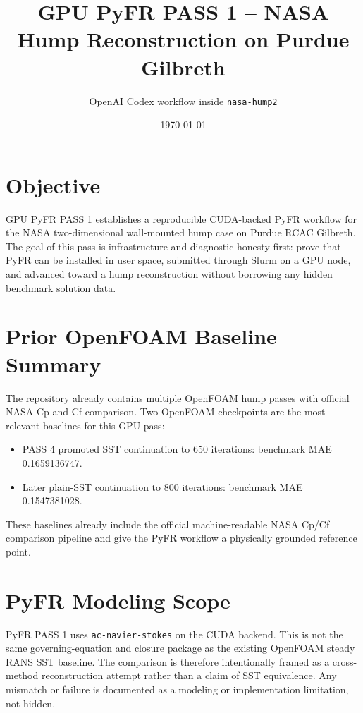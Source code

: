 \documentclass[11pt]{article}
\title{GPU PyFR PASS 1 -- NASA Hump Reconstruction on Purdue Gilbreth}
\author{OpenAI Codex workflow inside \texttt{nasa-hump2}}
\date{\today}
\begin{document}
\maketitle

\section{Objective}
GPU PyFR PASS 1 establishes a reproducible CUDA-backed PyFR workflow for the NASA two-dimensional wall-mounted hump case on Purdue RCAC Gilbreth. The goal of this pass is infrastructure and diagnostic honesty first: prove that PyFR can be installed in user space, submitted through Slurm on a GPU node, and advanced toward a hump reconstruction without borrowing any hidden benchmark solution data.

\section{Prior OpenFOAM Baseline Summary}
The repository already contains multiple OpenFOAM hump passes with official NASA Cp and Cf comparison. Two OpenFOAM checkpoints are the most relevant baselines for this GPU pass:
\begin{itemize}
  \item PASS 4 promoted SST continuation to 650 iterations: benchmark MAE \num{0.1659136747}.
  \item Later plain-SST continuation to 800 iterations: benchmark MAE \num{0.1547381028}.
\end{itemize}
These baselines already include the official machine-readable NASA Cp/Cf comparison pipeline and give the PyFR workflow a physically grounded reference point.

\section{PyFR Modeling Scope}
PyFR PASS 1 uses \texttt{ac-navier-stokes} on the CUDA backend. This is not the same governing-equation and closure package as the existing OpenFOAM steady RANS SST baseline. The comparison is therefore intentionally framed as a cross-method reconstruction attempt rather than a claim of SST equivalence. Any mismatch or failure is documented as a modeling or implementation limitation, not hidden.
\end{document}
